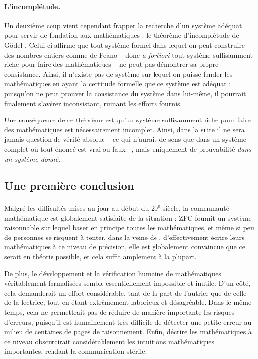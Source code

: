\paragraph{L’incomplétude.}
Un deuxième coup vient cependant frapper la recherche d’un système adéquat pour
servir de fondation aux mathématiques : le théorème d’incomplétude de Gödel
. Celui-ci affirme que tout système formel
dans lequel on peut construire des nombres entiers comme de Peano – donc
\textit{a fortiori} tout système suffisamment riche pour faire des mathématiques –
ne peut pas démontrer sa propre consistance. Ainsi, il n’existe pas de
système sur lequel on puisse fonder les mathématiques en ayant la certitude
formelle que ce système est adéquat : puisqu’on ne peut prouver la consistance du
système dans lui-même, il pourrait finalement s’avérer inconsistant, ruinant les
efforts fournis.

Une conséquence de ce théorème est qu’un système suffisamment riche
pour faire des mathématiques est nécessairement incomplet.
Ainsi, dans la suite il ne sera jamais question de vérité absolue –
ce qui n’aurait de sens que dans un système complet
où tout énoncé est vrai ou faux –, mais
uniquement de prouvabilité \emph{dans un système donné}.

\subsection{Une première conclusion}
Malgré les difficultés mises au jour au début du 20\textsuperscript{e}
siècle, la communauté mathématique est globalement
satisfaite de la situation : ZFC fournit un système raisonnable sur
lequel baser en principe toutes les mathématiques, et même si peu de
personnes se risquent à tenter, dans la veine de \cite{Whitehead1913},
d’effectivement écrire leurs mathématiques à ce niveau de précision,
elle est globalement convaincue que ce serait en théorie
possible, et cela suffit amplement à la plupart.

De plus, le développement et la vérification humaine de mathématiques véritablement
formalisées semble essentiellement impossible et inutile.
D’un côté, cela demanderait un effort considérable,
tant de la part de l’autrice que de celle de la lectrice, tout en étant
extrêmement laborieux et désagréable.
Dans le même temps, cela ne permettrait pas de réduire de manière importante
les risques d’erreurs, puisqu’il est
humainement très difficile de détecter une petite erreur au milieu de centaines de pages de raisonnement.
Enfin, décrire les mathématiques à ce niveau obscurcirait
considérablement les intuitions mathématiques importantes,
rendant la communication stérile.

